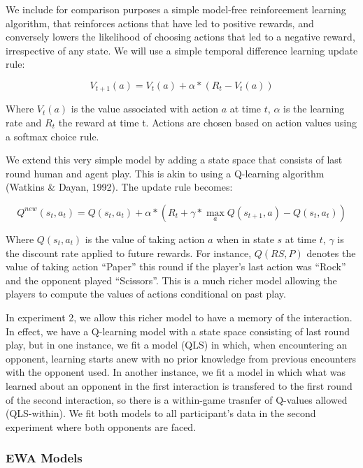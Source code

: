 \documentclass[man,floatsintext]{apa6}
\begin{document}
We include for comparison purposes a simple model-free reinforcement learning algorithm, that reinforces actions that have led to positive rewards, and conversely lowers the likelihood of choosing actions that led to a negative reward, irrespective of any state. We will use a simple temporal difference learning update rule:

\[ V_{t+1}(a) = V_{t}(a) + \alpha*( R_{t}  - V_{t}(a)) \]

Where \(V_{t}(a)\) is the value associated with action \(a\) at time \(t\), \(\alpha\) is the learning rate and \(R_{t}\) the reward at time t. Actions are chosen based on action values using a softmax choice rule.

We extend this very simple model by adding a state space that consists of last round human and agent play. This is akin to using a Q-learning algorithm (Watkins \& Dayan, 1992). The update rule becomes:

\[ Q^{new}(s_{t},a_{t}) = Q(s_{t},a_{t}) + \alpha*( R_{t}  + \gamma*\underset{a}{\max}Q(s_{t+1},a) - Q(s_{t},a_{t}) ) \]

Where \(Q(s_{t},a_{t})\) is the value of taking action \(a\) when in state \(s\) at time \(t\), \(\gamma\) is the discount rate applied to future rewards. For instance, \(Q(RS,P)\) denotes the value of taking action ``Paper'' this round if the player's last action was ``Rock'' and the opponent played ``Scissors''. This is a much richer model allowing the players to compute the values of actions conditional on past play.

In experiment 2, we allow this richer model to have a memory of the interaction. In effect, we have a Q-learning model with a state space consisting of last round play, but in one instance, we fit a model (QLS) in which, when encountering an opponent, learning starts anew with no prior knowledge from previous encounters with the opponent used. In another instance, we fit a model in which what was learned about an opponent in the first interaction is transfered to the first round of the second interaction, so there is a within-game trasnfer of Q-values allowed (QLS-within). We fit both models to all participant's data in the second experiment where both opponents are faced.

\hypertarget{ewa-models}{%
\subsubsection{EWA Models}\label{ewa-models}}
\end{document}
